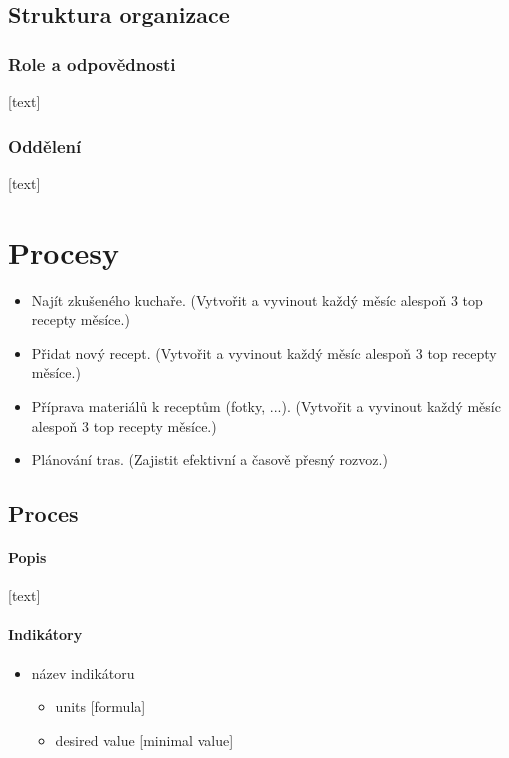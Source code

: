 \documentclass[11pt,a4paper]{article}
\begin{document}
\subsection{Struktura organizace}
\subsubsection{Role a odpovědnosti}

[text]

\subsubsection{Oddělení}

[text]

\section{Procesy}

\begin{itemize}
    \item Najít zkušeného kuchaře. (Vytvořit a vyvinout každý měsíc alespoň 3 top recepty měsíce.)
    \item Přidat nový recept. (Vytvořit a vyvinout každý měsíc alespoň 3 top recepty měsíce.)
    \item Příprava materiálů k receptům (fotky, ...). (Vytvořit a vyvinout každý měsíc alespoň 3 top recepty měsíce.)
    \item Plánování tras. (Zajistit efektivní a časově přesný rozvoz.)
\end{itemize}

\subsection{Proces }

\paragraph{Popis}

[text]

\paragraph{Indikátory}

\begin{itemize}
    \item název indikátoru
    \begin{itemize}
        \item units [formula]
        \item desired value [minimal value]
    \end{itemize}
\end{itemize}
\end{document}
